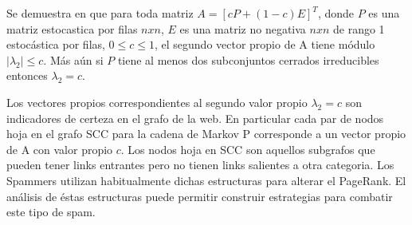 \documentclass{article}
\begin{document}
Se demuestra en \cite{ilprints582} que para toda matriz $A = [cP + (1-c)E]^T$, donde $P$ es una matriz estocastica por filas $nxn$, $E$ es una matriz no negativa $nxn$ de rango 1 estocástica por filas, $0\leq c \leq1$, el segundo vector propio de A tiene módulo $|\lambda_{2}| \leq c $. Más aún si $P$ tiene al menos dos subconjuntos cerrados irreducibles entonces $\lambda_{2} = c$.

Los vectores propios correspondientes al segundo valor propio $\lambda_{2} = c$ son indicadores de certeza en el grafo de la web. En particular cada par de nodos hoja en el grafo SCC para la cadena de Markov P corresponde a un vector propio de A con valor propio $c$. Los nodos hoja en SCC son aquellos subgrafos que pueden tener links entrantes pero no tienen links salientes a otra categoria. Los Spammers utilizan habitualmente dichas estructuras para alterar el PageRank. El análisis de éstas estructuras puede permitir construir estrategias para combatir este tipo de spam.
\cite{ilprints582}




\newpage




\newpage

\renewcommand{\appendixname}{Anexos}
\renewcommand{\appendixtocname}{Anexos}
\renewcommand{\appendixpagename}{Anexos}
\begin{appendices}



\newpage

\newpage

\newpage

\end{appendices}

\end{document}
